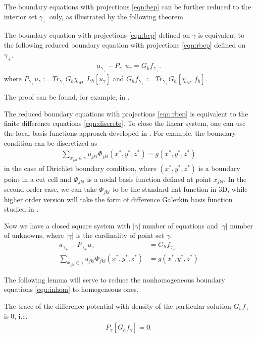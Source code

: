 The boundary equations with projections \eqref{eqn:bep} can be further reduced to the interior set $\gamma_+$ only, as illustrated by the following theorem.
\begin{theorem}
The boundary equation with projections \eqref{eqn:bep} defined on $\gamma$ is equivalent to the following reduced boundary equation with projections \eqref{eqn:rbep} defined on $\gamma_+$.
\begin{align}\label{eqn:rbep}
u_{\gamma_+} - P_{\gamma_+} u_\gamma = G_hf_{\gamma_+}.
\end{align}
where $P_{\gamma_+} u_\gamma:=Tr_{\gamma_+}G_h\chi_{M^-}L_h[u_\gamma]$ and $G_hf_{\gamma_+}:=Tr_{\gamma_+} G_h[\chi_{M^+}f_h]$.
\end{theorem}
The proof can be found, for example, in \cite{epshteyn2019efficient}.

The reduced boundary equations with projections \eqref{eqn:rbep} is equivalent to the finite difference equations \eqref{eqn:discrete}. To close the linear system, one can use the local basis functions approach developed in \cite{xia2023local}. For example, the boundary condition can be discretized as
\begin{align}\label{eqn:bc}
\sum_{x_{jkl}\in\gamma} u_{jkl} \Phi_{jkl}(x^*,y^*,z^*) = g(x^*,y^*,z^*)
\end{align}
in the case of Dirichlet boundary condition, 
where $(x^*,y^*,z^*)$ is a boundary point in a cut cell and $\Phi_{jkl}$ is a nodal basis function defined at point $x_{jkl}$. In the second order case, we can take $\Phi_{jkl}$ to be the standard hat function in 3D, while higher order version will take the form of difference Galerkin basis function studied in \cite{jacangelo2020galerkin,banks2016galerkin}.

Now we have a closed square system with $|\gamma|$ number of equations and $|\gamma|$ number of unknowns, where $|\gamma|$ is the cardinality of point set $\gamma$.
\begin{subequations}\label{eqn:inhom}
\begin{align}
u_{\gamma_+} - P_{\gamma_+} u_\gamma &= G_hf_{\gamma_+}\\
\sum_{x_{jkl}\in\gamma} u_{jkl} \Phi_{jkl}(x^*,y^*,z^*) &= g(x^*,y^*,z^*)
\end{align}
\end{subequations}

The following lemma will serve to reduce the nonhomogeneous boundary equations \eqref{eqn:inhom} to homogeneous ones.

\begin{theorem}\label{lem:dp_gh}
The trace of the difference potential with density of the particular solution $G_hf_\gamma$ is 0, i.e.
\begin{align}
P_\gamma [G_hf_\gamma] = 0.
\end{align}
\end{theorem}

